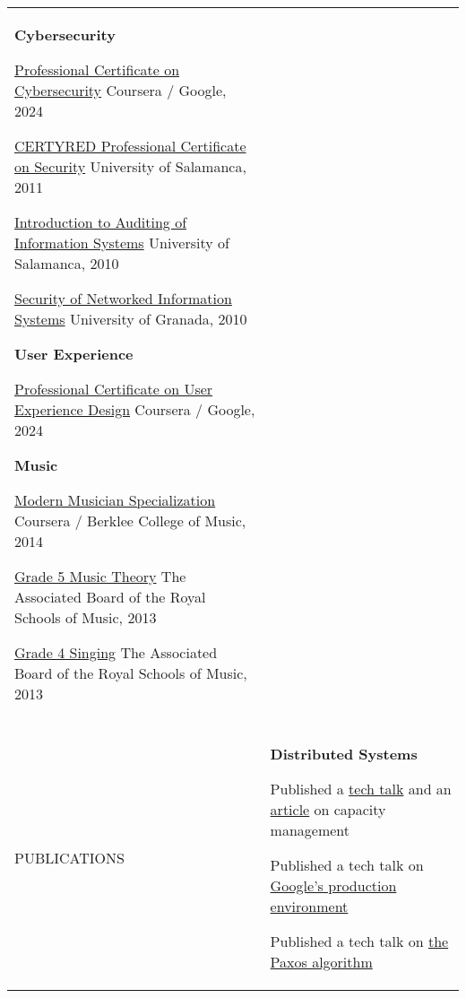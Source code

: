 \documentclass[letterpaper,10pt,oneside]{article}
\newcommand{\DatestampY}[1]{#1}
\newcommand{\itemspacingtwo}{\vspace{0.08cm}}
\newcommand{\sref}[2]{%
    \href{https://0/local/attachments/#1}{\textcolor{hiddenblue}{#2}}%
}
\newenvironment{body}
{\par\par
\begin{longtable}{p{0.145\textwidth}p{0.81\textwidth}}}
{\par\end{longtable}\par}
\renewcommand{\section}[3]{\\[-1.1cm]\pdfbookmark[2]{#2}{#3}\\%
\raggedleft  %
{\fontsize{9.5pt}{9.5pt}\selectfont\bfseries\raggedright%
\MakeUppercase{#1}}&}
\begin{document}
\begin{body}
\textbf{Cybersecurity}
\begin{comp}
\item \sref{Certificate-Coursera-Google-Cybersecurity.pdf}{Professional Certificate on Cybersecurity} \textemdash{ }Coursera / Google, \DatestampY{2024}
\item \sref{Certificate-Certyred.pdf}{CERTYRED Professional Certificate on Security} \textemdash{ }University of Salamanca, \DatestampY{2011}
\item \sref{Course-Salamanca-Auditing.pdf}{Introduction to Auditing of Information Systems} \textemdash{ }University of Salamanca, \DatestampY{2010}
\item \sref{Course-FE-Security.pdf}{Security of Networked Information Systems} \textemdash{ }University of Granada, \DatestampY{2010}
\end{comp}
\itemspacingtwo

\textbf{User Experience}
\begin{comp}
\item \sref{Certificate-Coursera-Google-UX-Design.pdf}{Professional Certificate on User Experience Design} \textemdash{ }Coursera / Google, \DatestampY{2024}
\end{comp}
\itemspacingtwo

\textbf{Music}
\begin{comp}
\item \sref{Diploma-BerkleeCollege-ModernMusician.pdf}{Modern Musician Specialization} \textemdash{ }Coursera / Berklee College of Music, \DatestampY{2014}
\item \sref{Diploma-ABRSM-MusicTheory5.pdf}{Grade 5 Music Theory} \textemdash{ }The Associated Board of the Royal Schools of Music, \DatestampY{2013}
\item \sref{Diploma-ABRSM-SingingGrade4.pdf}{Grade 4 Singing} \textemdash{ }The Associated Board of the Royal Schools of Music, \DatestampY{2013}
\end{comp}
\itemspacingtwo


\section{Publications}{Publications}{PDF:Publications}
\textbf{Distributed Systems}
\begin{comp}
\item Published a \href{https://youtu.be/pOo0oKNM9I8}{tech talk} and an \href{https://static.googleusercontent.com/media/sre.google/en//static/pdf/login_winter20_10_torres.pdf}{article} on capacity management
\item Published a tech talk on \href{https://youtu.be/dhTVVWzpc4Q}{Google's production environment}
\item Published a tech talk on \href{https://youtu.be/d7nAGI_NZPk}{the Paxos algorithm}
\end{comp}
\itemspacingtwo


\end{body}
\end{document}
